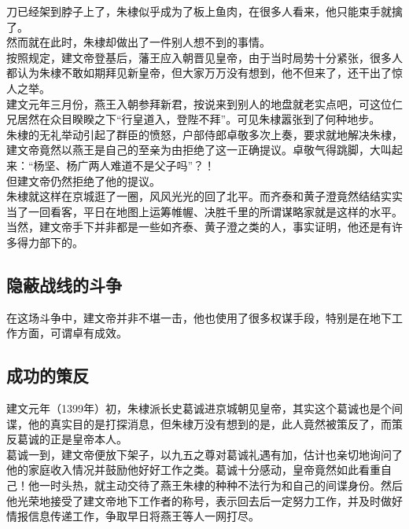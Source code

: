 \begin{multicols}{\theparacolNo}
刀已经架到脖子上了，朱棣似乎成为了板上鱼肉，在很多人看来，他只能束手就擒了。\\

然而就在此时，朱棣却做出了一件别人想不到的事情。\\

按照规定，建文帝登基后，藩王应入朝晋见皇帝，由于当时局势十分紧张，很多人都认为朱棣不敢如期拜见新皇帝，但大家万万没有想到，他不但来了，还干出了惊人之举。\\

建文元年三月份，燕王入朝参拜新君，按说来到别人的地盘就老实点吧，可这位仁兄居然在众目睽睽之下“行皇道入，登陛不拜”。可见朱棣嚣张到了何种地步。\\

朱棣的无礼举动引起了群臣的愤怒，户部侍郎卓敬多次上奏，要求就地解决朱棣，建文帝竟然以燕王是自己的至亲为由拒绝了这一正确提议。卓敬气得跳脚，大叫起来：“杨坚、杨广两人难道不是父子吗”？！\\

但建文帝仍然拒绝了他的提议。\\

朱棣就这样在京城逛了一圈，风风光光的回了北平。而齐泰和黄子澄竟然结结实实当了一回看客，平日在地图上运筹帷幄、决胜千里的所谓谋略家就是这样的水平。\\

当然，建文帝手下并非都是一些如齐泰、黄子澄之类的人，事实证明，他还是有许多得力部下的。\\

\subsection{隐蔽战线的斗争}
在这场斗争中，建文帝并非不堪一击，他也使用了很多权谋手段，特别是在地下工作方面，可谓卓有成效。\\

\subsection{成功的策反}
建文元年（1399年）初，朱棣派长史葛诚进京城朝见皇帝，其实这个葛诚也是个间谍，他的真实目的是打探消息，但朱棣万没有想到的是，此人竟然被策反了，而策反葛诚的正是皇帝本人。\\

葛诚一到，建文帝便放下架子，以九五之尊对葛诚礼遇有加，估计也亲切地询问了他的家庭收入情况并鼓励他好好工作之类。葛诚十分感动，皇帝竟然如此看重自己！他一时头热，就主动交待了燕王朱棣的种种不法行为和自己的间谍身份。然后他光荣地接受了建文帝地下工作者的称号，表示回去后一定努力工作，并及时做好情报信息传递工作，争取早日将燕王等人一网打尽。\\


\end{multicols}
